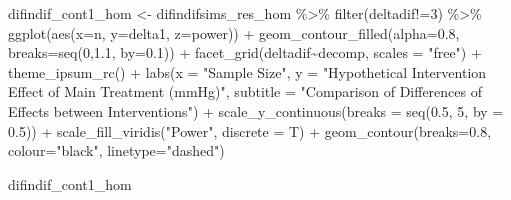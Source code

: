 \documentclass[
]{article}
\newenvironment{Shaded}{\begin{snugshade}}{\end{snugshade}}
\newcommand{\AttributeTok}[1]{\textcolor[rgb]{0.77,0.63,0.00}{#1}}
\newcommand{\DecValTok}[1]{\textcolor[rgb]{0.00,0.00,0.81}{#1}}
\newcommand{\FloatTok}[1]{\textcolor[rgb]{0.00,0.00,0.81}{#1}}
\newcommand{\FunctionTok}[1]{\textcolor[rgb]{0.00,0.00,0.00}{#1}}
\newcommand{\NormalTok}[1]{#1}
\newcommand{\OtherTok}[1]{\textcolor[rgb]{0.56,0.35,0.01}{#1}}
\newcommand{\SpecialCharTok}[1]{\textcolor[rgb]{0.00,0.00,0.00}{#1}}
\newcommand{\StringTok}[1]{\textcolor[rgb]{0.31,0.60,0.02}{#1}}
\begin{document}
\begin{Shaded}
\begin{Highlighting}[]
\NormalTok{difindif\_cont1\_hom }\OtherTok{\textless{}{-}}\NormalTok{ difindifsims\_res\_hom }\SpecialCharTok{\%\textgreater{}\%} 
  \FunctionTok{filter}\NormalTok{(deltadif}\SpecialCharTok{!=}\DecValTok{3}\NormalTok{) }\SpecialCharTok{\%\textgreater{}\%} 
  \FunctionTok{ggplot}\NormalTok{(}\FunctionTok{aes}\NormalTok{(}\AttributeTok{x=}\NormalTok{n, }\AttributeTok{y=}\NormalTok{delta1, }\AttributeTok{z=}\NormalTok{power)) }\SpecialCharTok{+}
  \FunctionTok{geom\_contour\_filled}\NormalTok{(}\AttributeTok{alpha=}\FloatTok{0.8}\NormalTok{, }\AttributeTok{breaks=}\FunctionTok{seq}\NormalTok{(}\DecValTok{0}\NormalTok{,}\FloatTok{1.1}\NormalTok{, }\AttributeTok{by=}\FloatTok{0.1}\NormalTok{)) }\SpecialCharTok{+}
  \FunctionTok{facet\_grid}\NormalTok{(deltadif}\SpecialCharTok{\textasciitilde{}}\NormalTok{decomp, }\AttributeTok{scales =} \StringTok{"free"}\NormalTok{) }\SpecialCharTok{+}
  \FunctionTok{theme\_ipsum\_rc}\NormalTok{() }\SpecialCharTok{+}
  \FunctionTok{labs}\NormalTok{(}\AttributeTok{x =} \StringTok{"Sample Size"}\NormalTok{,}
       \AttributeTok{y =} \StringTok{"Hypothetical Intervention Effect of Main Treatment (mmHg)"}\NormalTok{,}
       \AttributeTok{subtitle =} \StringTok{"Comparison of Differences of Effects between Interventions"}\NormalTok{) }\SpecialCharTok{+}
  \FunctionTok{scale\_y\_continuous}\NormalTok{(}\AttributeTok{breaks =} \FunctionTok{seq}\NormalTok{(}\FloatTok{0.5}\NormalTok{, }\DecValTok{5}\NormalTok{, }\AttributeTok{by =} \FloatTok{0.5}\NormalTok{)) }\SpecialCharTok{+}
  \FunctionTok{scale\_fill\_viridis}\NormalTok{(}\StringTok{"Power"}\NormalTok{, }\AttributeTok{discrete =}\NormalTok{ T) }\SpecialCharTok{+}
  \FunctionTok{geom\_contour}\NormalTok{(}\AttributeTok{breaks=}\FloatTok{0.8}\NormalTok{, }\AttributeTok{colour=}\StringTok{"black"}\NormalTok{, }\AttributeTok{linetype=}\StringTok{"dashed"}\NormalTok{)}

\NormalTok{difindif\_cont1\_hom}
\end{Highlighting}
\end{Shaded}
\end{document}
